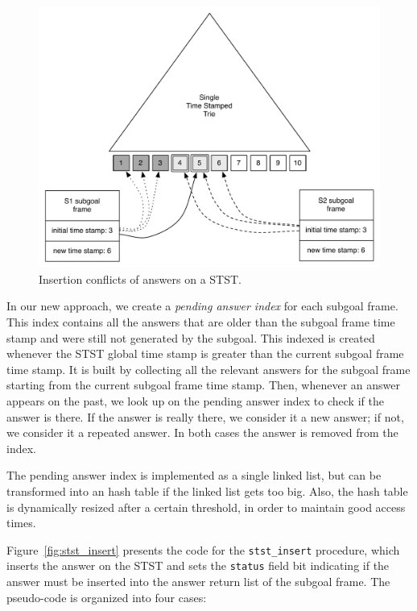 \begin{figure}[ht]
  \centering
    \includegraphics[scale=0.5]{stst_conflicts.pdf}
  \caption{Insertion conflicts of answers on a STST.}
  \label{fig:stst_conflicts}
\end{figure}

In our new approach, we create a \textit{pending answer index} for each subgoal frame.
This index contains all the answers that are older than the subgoal frame time stamp
and were still not generated by the subgoal. This indexed is created whenever the STST
global time stamp is greater than the current subgoal frame time stamp. It is built by
collecting all the relevant answers for the subgoal frame starting from the current
subgoal frame time stamp. Then, whenever an answer appears on the past, we look up on the
pending answer index to check if the answer is there. If the answer is really there,
we consider it a new answer; if not, we consider it a repeated answer. In both cases
the answer is removed from the index.

The pending answer index is implemented as a single linked list, but can be transformed
into an hash table if the linked list gets too big. Also, the hash table is dynamically
resized after a certain threshold, in order to maintain good access times.

Figure~\ref{fig:stst_insert} presents the code for the \texttt{stst\_insert} procedure,
which inserts the answer on the STST and sets the \texttt{status} field bit indicating
if the answer must be inserted into the answer return list of the subgoal frame. The
pseudo-code is organized into four cases:


